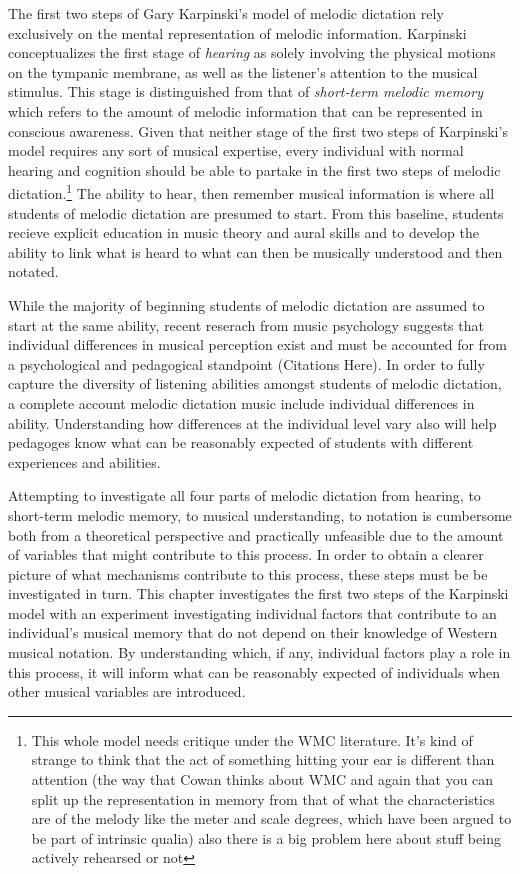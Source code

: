 \documentclass[]{book}
\let\rmarkdownfootnote\footnote%
\def\footnote{\protect\rmarkdownfootnote}
\begin{document}
The first two steps of Gary Karpinski's model of melodic dictation \citep{karpinskiAuralSkillsAcquisition2000, karpinskiModelMusicPerception1990} rely exclusively on the mental representation of melodic information.
Karpinski conceptualizes the first stage of \emph{hearing} as solely involving the physical motions on the tympanic membrane, as well as the listener's attention to the musical stimulus.
This stage is distinguished from that of \emph{short-term melodic memory} which refers to the amount of melodic information that can be represented in conscious awareness.
Given that neither stage of the first two steps of Karpinski's model requires any sort of musical expertise, every individual with normal hearing and cognition should be able to partake in the first two steps of melodic dictation.\footnote{This whole model needs critique under the WMC literature. It's kind of strange to think that the act of something hitting your ear is different than attention (the way that Cowan thinks about WMC and again that you can split up the representation in memory from that of what the characteristics are of the melody like the meter and scale degrees, which have been argued to be part of intrinsic qualia) also there is a big problem here about stuff being actively rehearsed or not}
The ability to hear, then remember musical information is where all students of melodic dictation are presumed to start.
From this baseline, students recieve explicit education in music theory and aural skills and to develop the ability to link what is heard to what can then be musically understood and then notated.

While the majority of beginning students of melodic dictation are assumed to start at the same ability, recent reserach from music psychology suggests that individual differences in musical perception exist and must be accounted for from a psychological and pedagogical standpoint (Citations Here).
In order to fully capture the diversity of listening abilities amongst students of melodic dictation, a complete account melodic dictation music include individual differences in ability.
Understanding how differences at the individual level vary also will help pedagoges know what can be reasonably expected of students with different experiences and abilities.

Attempting to investigate all four parts of melodic dictation from hearing, to short-term melodic memory, to musical understanding, to notation is cumbersome both from a theoretical perspective and practically unfeasible due to the amount of variables that might contribute to this process.
In order to obtain a clearer picture of what mechanisms contribute to this process, these steps must be be investigated in turn.
This chapter investigates the first two steps of the Karpinski model with an experiment investigating individual factors that contribute to an individual's musical memory that do not depend on their knowledge of Western musical notation.
By understanding which, if any, individual factors play a role in this process, it will inform what can be reasonably expected of individuals when other musical variables are introduced.
\end{document}
